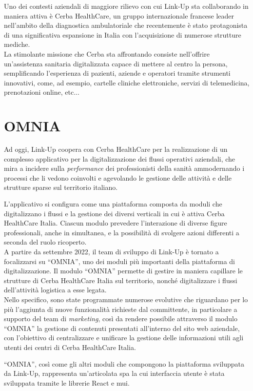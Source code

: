 Uno dei contesti aziendali di maggiore rilievo con cui Link-Up sta collaborando in maniera attiva è Cerba HealthCare, un gruppo internazionale francese leader nell'ambito della diagnostica ambulatoriale che recentemente è stato protagonista di una significativa espansione in Italia con l'acquisizione di numerose strutture mediche.\\
La stimolante missione che Cerba sta affrontando consiste nell'offrire un'assistenza sanitaria digitalizzata capace di mettere al centro la persona, semplificando l'esperienza di pazienti, aziende e operatori tramite strumenti innovativi, come, ad esempio, cartelle cliniche elettroniche, servizi di telemedicina, prenotazioni online, etc...

\section{OMNIA}
\label{sec:OMNIA}
Ad oggi, Link-Up coopera con Cerba HealthCare per la realizzazione di un complesso applicativo per la digitalizzazione dei flussi operativi aziendali, che mira a incidere sulla \textit{performance} dei professionisti della sanità ammodernando i processi che li vedono coinvolti e agevolando le gestione delle attività e delle strutture sparse sul territorio italiano.

L'applicativo si configura come una piattaforma composta da moduli che digitalizzano i flussi e la gestione dei diversi verticali in cui è attiva Cerba HealthCare Italia. Ciascun modulo prevedere l'interazione di diverse figure professionali, anche in simultanea, e la possibilità di svolgere azioni differenti a seconda del ruolo ricoperto.\\
A partire da settembre 2022, il team di sviluppo di Link-Up è tornato a focalizzarsi su “OMNIA”, uno dei moduli più importanti della piattaforma di digitalizzazione. Il modulo “OMNIA” permette di gestire in maniera capillare le strutture di Cerba HealthCare Italia sul territorio, nonché digitalizzare i flussi dell'attività logistica a esse legata.\\
Nello specifico, sono state programmate numerose evolutive che riguardano per lo più l'aggiunta di nuove funzionalità richieste dal committente, in particolare a supporto del team di \textit{marketing}, così da rendere possibile attraverso il modulo “OMNIA” la gestione di contenuti presentati all'interno del sito web aziendale, con l'obiettivo di centralizzare e unificare la gestione delle informazioni utili agli utenti dei centri di Cerba HealthCare Italia.

“OMNIA”, così come gli altri moduli che compongono la piattaforma sviluppata da Link-Up, rappresenta un'articolata \acrlong{spa} la cui interfaccia utente è stata sviluppata tramite le librerie React e \gls{mui}.

